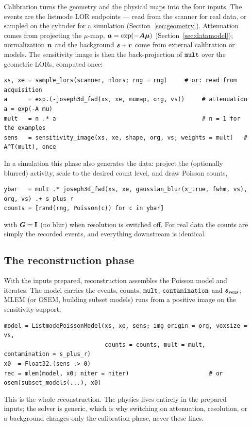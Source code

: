 Calibration turns the geometry and the physical maps into the four inputs. The
events are the listmode LOR endpoints --- read from the scanner for real data, or
sampled on the cylinder for a simulation (Section~\ref{sec:geometry}).
Attenuation comes from projecting the $\mu$-map, $\bm{a}=\exp(-\bm{A}\bm\mu)$
(Section~\ref{sec:datamodel}); normalization $\bm{n}$ and the background
$\bm{s}+\bm{r}$ come from external calibration or models. The sensitivity image is
then the back-projection of $\texttt{mult}$ over the geometric LORs, computed once:
\begin{lstlisting}
xs, xe = sample_lors(scanner, nlors; rng = rng)     # or: read from acquisition
a      = exp.(-joseph3d_fwd(xs, xe, mumap, org, vs))     # attenuation a = exp(-A mu)
mult   = n .* a                                          # n = 1 for the examples
sens   = sensitivity_image(xs, xe, shape, org, vs; weights = mult)   # A^T(mult), once
\end{lstlisting}
In a simulation this phase also generates the data: project the (optionally
blurred) activity, scale to the desired count level, and draw Poisson counts,
\begin{lstlisting}
ybar   = mult .* joseph3d_fwd(xs, xe, gaussian_blur(x_true, fwhm, vs), org, vs) .+ s_plus_r
counts = [rand(rng, Poisson(c)) for c in ybar]
\end{lstlisting}
with $\bm{G}=\mathbf I$ (no blur) when resolution is switched off. For real data the
counts are simply the recorded events, and everything downstream is identical.

\subsection{The reconstruction phase}
\label{sec:pipeline:recon}

With the inputs prepared, reconstruction assembles the Poisson model and iterates.
The model carries the events, counts, $\texttt{mult}$, $\texttt{contamination}$ and
$\bm{s}_{\mathrm{sens}}$; MLEM (or OSEM, building subset models) runs from a positive image on the
sensitivity support:
\begin{lstlisting}
model = ListmodePoissonModel(xs, xe, sens; img_origin = org, voxsize = vs,
                             counts = counts, mult = mult, contamination = s_plus_r)
x0  = Float32.(sens .> 0)
rec = mlem(model, x0; niter = niter)                       # or osem(subset_models(...), x0)
\end{lstlisting}
This is the whole reconstruction. The physics lives entirely in the prepared
inputs; the solver is generic, which is why switching on attenuation, resolution,
or a background changes only the calibration phase, never these lines.

